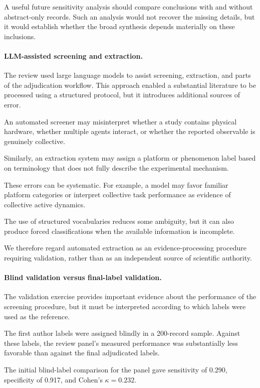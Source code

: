 A useful future
sensitivity analysis
should compare
conclusions with
and without
abstract-only records.
Such an analysis
would not recover
the missing details,
but it would
establish whether
the broad synthesis
depends materially
on these inclusions.

\paragraph*{LLM-assisted screening and extraction.}

The review used large language models
to assist screening, extraction,
and parts of the adjudication
workflow. This approach enabled
a substantial literature
to be processed using
a structured protocol,
but it introduces
additional sources
of error.

An automated screener
may misinterpret
whether a study
contains physical
hardware, whether
multiple agents
interact, or whether
the reported
observable is genuinely
collective.

Similarly, an extraction
system may assign
a platform or
phenomenon label
based on terminology
that does not
fully describe
the experimental mechanism.

These errors can
be systematic.
For example,
a model may
favor familiar
platform categories
or interpret
collective task
performance as
evidence of
collective active
dynamics.

The use of
structured vocabularies
reduces some ambiguity,
but it can also
produce forced
classifications
when the available
information is
incomplete.

We therefore
regard automated
extraction as
an evidence-processing
procedure requiring
validation, rather
than as an independent
source of
scientific authority.

\paragraph*{Blind validation versus final-label validation.}

The validation exercise
provides important evidence
about the performance
of the screening procedure,
but it must be
interpreted according
to which labels
were used as
the reference.

The first author
labels were assigned
blindly in a
200-record sample.
Against these
labels, the
review panel's
measured performance
was substantially
less favorable
than against
the final
adjudicated labels.

The initial
blind-label comparison
for the panel
gave sensitivity
of 0.290,
specificity
of 0.917,
and Cohen's
$\kappa=0.232$.

